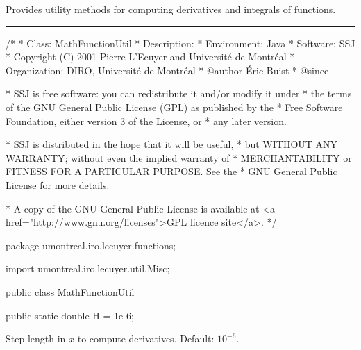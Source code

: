 
Provides utility methods for computing
derivatives and integrals of functions.

\bigskip\hrule

\begin{code}
\begin{hide}
/*
 * Class:        MathFunctionUtil
 * Description:  
 * Environment:  Java
 * Software:     SSJ 
 * Copyright (C) 2001  Pierre L'Ecuyer and Université de Montréal
 * Organization: DIRO, Université de Montréal
 * @author       Éric Buist
 * @since

 * SSJ is free software: you can redistribute it and/or modify it under
 * the terms of the GNU General Public License (GPL) as published by the
 * Free Software Foundation, either version 3 of the License, or
 * any later version.

 * SSJ is distributed in the hope that it will be useful,
 * but WITHOUT ANY WARRANTY; without even the implied warranty of
 * MERCHANTABILITY or FITNESS FOR A PARTICULAR PURPOSE.  See the
 * GNU General Public License for more details.

 * A copy of the GNU General Public License is available at
   <a href="http://www.gnu.org/licenses">GPL licence site</a>.
 */
\end{hide}
package umontreal.iro.lecuyer.functions;\begin{hide}

import umontreal.iro.lecuyer.util.Misc;
\end{hide}

public class MathFunctionUtil\begin{hide} {
\end{hide}

   public static double H = 1e-6;
\end{code}
\begin{tabb} Step length in $x$ to compute derivatives. Default: $10^{-6}$.
\end{tabb}
